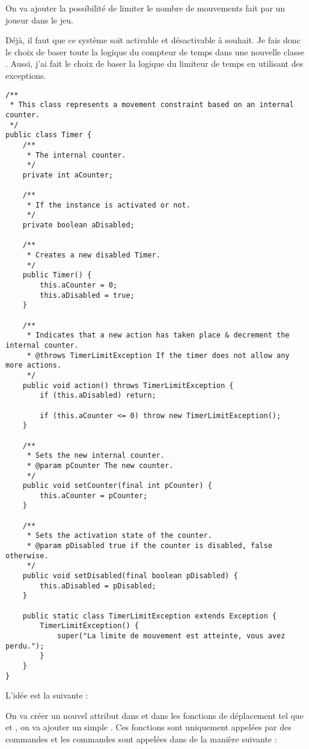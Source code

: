 \begin{exercise}[subtitle=Limite de temps]

On va ajouter la possibilité de limiter le nombre de mouvements fait par un joueur dans le jeu.

Déjà, il faut que ce système soit activable et désactivable à souhait. Je fais donc le choix de baser toute la logique du compteur de temps dans une nouvelle classe .
Aussi, j'ai fait le choix de baser la logique du limiteur de temps en utilisant des exceptions.

\begin{verbatim}
/**
 * This class represents a movement constraint based on an internal counter.
 */
public class Timer {
    /**
     * The internal counter.
     */
    private int aCounter;

    /**
     * If the instance is activated or not.
     */
    private boolean aDisabled;

    /**
     * Creates a new disabled Timer.
     */
    public Timer() {
        this.aCounter = 0;
        this.aDisabled = true;
    }

    /**
     * Indicates that a new action has taken place & decrement the internal counter.
     * @throws TimerLimitException If the timer does not allow any more actions.
     */
    public void action() throws TimerLimitException {
        if (this.aDisabled) return;

        if (this.aCounter <= 0) throw new TimerLimitException();
    }

    /**
     * Sets the new internal counter.
     * @param pCounter The new counter.
     */
    public void setCounter(final int pCounter) {
        this.aCounter = pCounter;
    }

    /**
     * Sets the activation state of the counter.
     * @param pDisabled true if the counter is disabled, false otherwise.
     */
    public void setDisabled(final boolean pDisabled) {
        this.aDisabled = pDisabled;
    }

    public static class TimerLimitException extends Exception {
        TimerLimitException() {
            super("La limite de mouvement est atteinte, vous avez perdu.");
        }
    }
}
\end{verbatim}

L'idée est la suivante :

On va créer un nouvel attribut  dans  et dans les fonctions de déplacement tel que  et , on va ajouter un simple . Ces fonctions sont uniquement appelées par des commandes et les commandes sont appelées dans  de la manière suivante :


\end{exercise}
